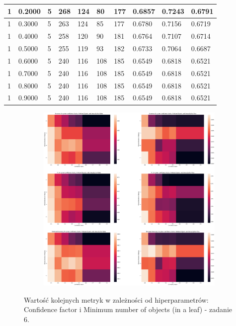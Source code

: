 \documentclass[12pt]{article}
\begin{document}
\begin{table}
{\begin{tabular}{| l | l | l | l | l | l | l | l | l | l |}
			1 & 0.2000 & 5 & 268 & 124 & 80 & 177 & 0.6857 & 0.7243 & 0.6791\\ \hline
			1 & 0.3000 & 5 & 263 & 124 & 85 & 177 & 0.6780 & 0.7156 & 0.6719\\ \hline
			1 & 0.4000 & 5 & 258 & 120 & 90 & 181 & 0.6764 & 0.7107 & 0.6714\\ \hline
			1 & 0.5000 & 5 & 255 & 119 & 93 & 182 & 0.6733 & 0.7064 & 0.6687\\ \hline
			1 & 0.6000 & 5 & 240 & 116 & 108 & 185 & 0.6549 & 0.6818 & 0.6521\\ \hline
			1 & 0.7000 & 5 & 240 & 116 & 108 & 185 & 0.6549 & 0.6818 & 0.6521\\ \hline
			1 & 0.8000 & 5 & 240 & 116 & 108 & 185 & 0.6549 & 0.6818 & 0.6521\\ \hline
			1 & 0.9000 & 5 & 240 & 116 & 108 & 185 & 0.6549 & 0.6818 & 0.6521\\ \hline
			
		\end{tabular}
	}
\end{table}
\clearpage
\begin{figure}[h!]
	\centering
	\begin{subfigure}[b]{1\linewidth}
		\includegraphics[width=\linewidth]{Port_all.png}
	\end{subfigure}
	\label{fig:dyskretne}
	\caption{Wartość kolejnych metryk w zależności od hiperparametrów: Confidence factor i Minimum number of objects (in a leaf) - zadanie 6.}
\end{figure}
\end{document}
